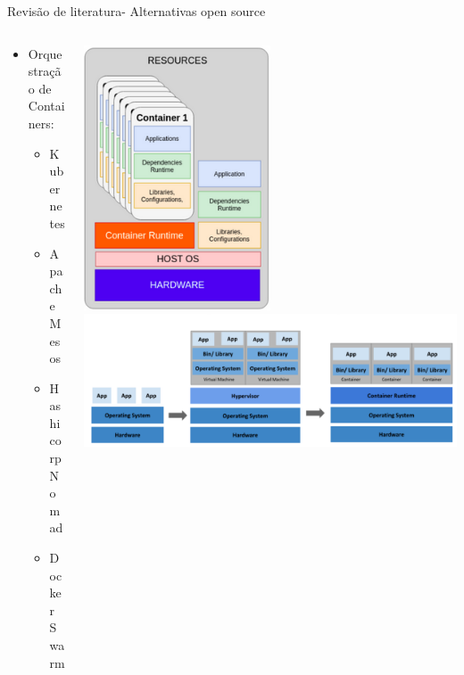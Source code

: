 \documentclass[10pt,brazil]{beamer}
\theoremstyle{definition}
\begin{document}
\begin{frame}{Revisão de literatura- Alternativas open source}
  \begin{columns}
    \begin{column}{0.5\textwidth}
      \begin{itemize}
        \item Orquestração de Containers:
              \begin{itemize}
                \item Kubernetes\textregistered
                \item Apache Mesos\textregistered
                \item Hashicorp Nomad\textregistered
                \item Docker Swarm\textregistered
              \end{itemize}
      \end{itemize}
    \end{column}
    \begin{column}{0.5\textwidth}  %
      \begin{center}
        \includegraphics[width=0.5\textwidth]{containers.png}
        \includegraphics[width=1\textwidth]{vmsContainer.png}
      \end{center}
    \end{column}
  \end{columns}
\end{frame}
\end{document}
